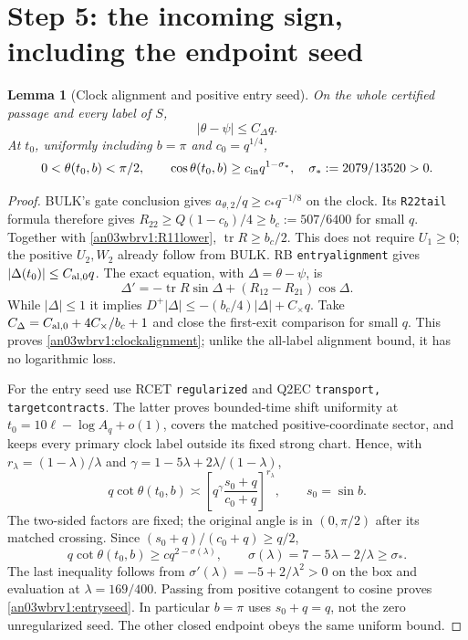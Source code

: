 \documentclass[11pt]{article}
\numberwithin{equation}{section}
\newtheorem{lemma}[theorem]{Lemma}
\theoremstyle{remark}\newtheorem{remark}[theorem]{Remark}
\begin{document}
\section{Step 5: the incoming sign, including the endpoint seed}
\begin{lemma}[Clock alignment and positive entry seed]
\label{an03wbrv1:incomingpre}
On the whole certified passage and every label of $S$,
\begin{equation}
 |\theta-\psi|\le C_\Delta q.
 \label{an03wbrv1:clockalignment}
\end{equation}
At $t_0$, uniformly including $b=\pi$ and $c_0=q^{1/4}$,
\begin{equation}
 0<\theta(t_0,b)<\pi/2,\qquad
 \cos\theta(t_0,b)\ge c_{\rm in}q^{1-\sigma_*},
 \quad \sigma_*:=2079/13520>0.
 \label{an03wbrv1:entryseed}
\end{equation}
\end{lemma}
\begin{proof}
BULK's gate conclusion gives $a_{\theta,2}/q\ge c_*q^{-1/8}$
on the clock. Its \texttt{R22tail} formula therefore gives
$R_{22}\ge Q(1-c_b)/4\ge b_c:=507/6400$ for small $q$.
Together with \eqref{an03wbrv1:R11lower},
$\operatorname{tr}R\ge b_c/2$. This does not require $U_1\ge0$;
the positive $U_2,W_2$ already follow from BULK.
RB \texttt{entryalignment} gives $|\Delta(t_0)|\le C_{\rm al,0}q$.
The exact equation, with $\Delta=\theta-\psi$, is
\[
 \Delta'=-\operatorname{tr}R\sin\Delta+(R_{12}-R_{21})\cos\Delta.
\]
While $|\Delta|\le1$ it implies
$D^+|\Delta|\le-(b_c/4)|\Delta|+C_\times q$.
Take $C_\Delta=C_{\rm al,0}+4C_\times/b_c+1$ and close the
first-exit comparison for small $q$. This proves
\eqref{an03wbrv1:clockalignment}; unlike the all-label alignment
bound, it has no logarithmic loss.

For the entry seed use RCET \texttt{regularized} and Q2EC
\texttt{transport, targetcontracts}. The latter proves bounded-time
shift uniformity at $t_0=10\ell-\log A_q+o(1)$, covers the matched
positive-coordinate sector, and keeps every primary clock label
outside its fixed strong chart. Hence, with
$r_\lambda=(1-\lambda)/\lambda$ and
$\gamma=1-5\lambda+2\lambda/(1-\lambda)$,
\[
 q\cot\theta(t_0,b)\asymp
 \left[q^\gamma\frac{s_0+q}{c_0+q}\right]^{r_\lambda},
 \qquad s_0=\sin b.
\]
The two-sided factors are fixed; the original angle is in $(0,\pi/2)$
after its matched crossing. Since $(s_0+q)/(c_0+q)\ge q/2$,
\[
 q\cot\theta(t_0,b)\ge c q^{2-\sigma(\lambda)},\qquad
 \sigma(\lambda)=7-5\lambda-2/\lambda\ge\sigma_*.
\]
The last inequality follows from
$\sigma'(\lambda)=-5+2/\lambda^2>0$ on the box and evaluation
at $\lambda=169/400$. Passing from positive cotangent to cosine
proves \eqref{an03wbrv1:entryseed}. In particular $b=\pi$ uses
$s_0+q=q$, not the zero unregularized seed. The other closed
endpoint obeys the same uniform bound.
\end{proof}
\end{document}
